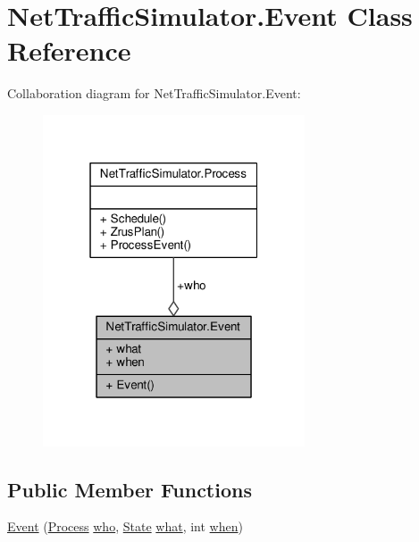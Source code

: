 \hypertarget{classNetTrafficSimulator_1_1Event}{\section{Net\-Traffic\-Simulator.\-Event Class Reference}
\label{classNetTrafficSimulator_1_1Event}
}


Collaboration diagram for Net\-Traffic\-Simulator.\-Event\-:
\nopagebreak
\begin{figure}[H]
\begin{center}
\leavevmode
\includegraphics[width=220pt]{classNetTrafficSimulator_1_1Event__coll__graph}
\end{center}
\end{figure}
\subsection*{Public Member Functions}
\begin{DoxyCompactItemize}
\item 
\hyperlink{classNetTrafficSimulator_1_1Event_aef44764a674bdc8f6c73d6d57490517d}{Event} (\hyperlink{classNetTrafficSimulator_1_1Process}{Process} \hyperlink{classNetTrafficSimulator_1_1Event_a2bf4854e94376c4577643120a3a92d96}{who}, \hyperlink{namespaceNetTrafficSimulator_a32d3ec79cec8f7c31bf8659afcca45c8}{State} \hyperlink{classNetTrafficSimulator_1_1Event_ababdb18d23b8e6ccad9a6dbe01501c42}{what}, int \hyperlink{classNetTrafficSimulator_1_1Event_a6e2cc07d321e15875f0f254246c4369c}{when})
\end{DoxyCompactItemize}
